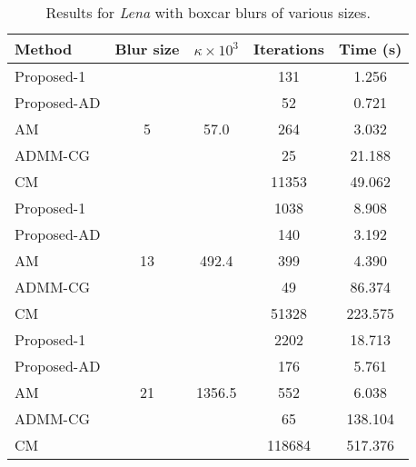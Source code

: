 \documentclass[10pt,twocolumn,twoside]{IEEEtran}
\begin{document}
\begin{table}[h]
	\renewcommand{\arraystretch}{1}
	\caption{Results for \textit{Lena} with boxcar blurs of various sizes.}
	\centering
\begin{tabular}{l|c|c|c|c}
Method &Blur size &$\kappa \times 10^3$ &Iterations &Time (s) \\
\hline
Proposed-1 & \multirow{5}{*}{5} & \multirow{5}{*}{57.0} &  131 & 1.256  \\ 
Proposed-AD & & &   52 & 0.721 \\ 
AM & & &  264 & 3.032 \\ 
ADMM-CG & & &   25 & 21.188 \\ 
CM & & & 11353 & 49.062 \\ 
\hline 
Proposed-1 & \multirow{5}{*}{13} & \multirow{5}{*}{492.4} & 1038 & 8.908  \\ 
Proposed-AD & & &  140 & 3.192 \\ 
AM & & &  399 & 4.390 \\ 
ADMM-CG & & &   49 & 86.374 \\ 
CM & & & 51328 & 223.575 \\ 
\hline 
Proposed-1 & \multirow{5}{*}{21} & \multirow{5}{*}{1356.5} & 2202 & 18.713  \\ 
Proposed-AD & & &  176 & 5.761 \\ 
AM & & &  552 & 6.038 \\ 
ADMM-CG & & &   65 & 138.104 \\ 
CM & & & 118684 & 517.376 \\ 
\hline 
\end{tabular}
\end{table}
\end{document}
